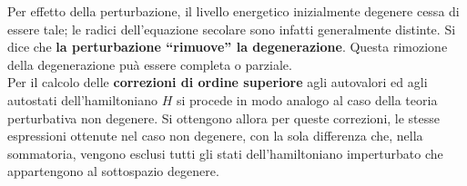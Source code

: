 Per effetto della perturbazione, il livello energetico inizialmente degenere cessa di essere tale; le radici dell'equazione secolare sono infatti generalmente distinte. Si dice che \textbf{la perturbazione ``rimuove'' la degenerazione}. Questa rimozione della degenerazione puà essere completa o parziale.\\

Per il calcolo delle \textbf{correzioni di ordine superiore} agli autovalori ed agli autostati dell'hamiltoniano $H$ si procede in modo analogo al caso della teoria perturbativa non degenere. Si ottengono allora per queste correzioni, le stesse espressioni ottenute nel caso non degenere, con la sola differenza che, nella sommatoria, vengono esclusi tutti gli stati dell'hamiltoniano imperturbato che appartengono al sottospazio degenere.

